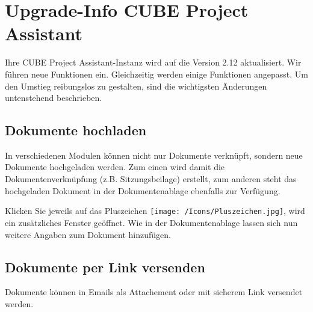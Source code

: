\section{Upgrade-Info CUBE Project Assistant} %

Ihre CUBE Project Assistant-Instanz wird auf die Version 2.12 aktualisiert. Wir führen neue Funktionen ein. Gleichzeitig werden einige Funktionen angepasst. Um den Umstieg reibungslos zu gestalten, sind die wichtigsten Änderungen untenstehend beschrieben.

\subsection{Dokumente hochladen}
In verschiedenen Modulen können nicht nur Dokumente verknüpft, sondern neue Dokumente hochgeladen werden. Zum einen wird damit die Dokumentenverknüpfung (z.B. Sitzungsbeilage) erstellt, zum anderen steht das hochgeladen Dokument in der Dokumentenablage ebenfalls zur Verfügung.

\begin{figure}[H]
\end{figure}

Klicken Sie jeweils auf das Pluszeichen \texttt{[image: /Icons/Pluszeichen.jpg]}, wird ein zusätzliches Fenster geöffnet. Wie in der Dokumentenablage lassen sich nun weitere Angaben zum Dokument hinzufügen.

\subsection{Dokumente per Link versenden}
Dokumente können in Emails als Attachement oder mit sicherem Link versendet werden.

